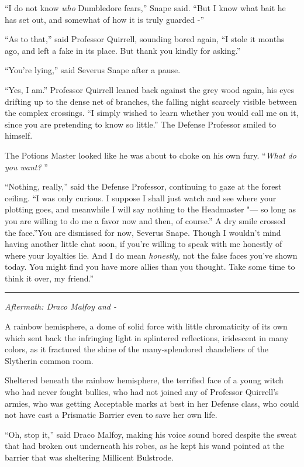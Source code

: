 ``I do not know \emph{who} Dumbledore fears,'' Snape said. ``But I know
what bait he has set out, and somewhat of how it is truly guarded -''

``As to that,'' said Professor Quirrell, sounding bored again, ``I stole
it months ago, and left a fake in its place. But thank you kindly for
asking.''

``You're lying,'' said Severus Snape after a pause.

``Yes, I am.'' Professor Quirrell leaned back against the grey wood
again, his eyes drifting up to the dense net of branches, the falling
night scarcely visible between the complex crossings. ``I simply wished
to learn whether you would call me on it, since you are pretending to
know so little.'' The Defense Professor smiled to himself.

The Potions Master looked like he was about to choke on his own fury.
``\emph{What do you want?} ''

``Nothing, really,'' said the Defense Professor, continuing to gaze at
the forest ceiling. ``I was only curious. I suppose I shall just watch
and see where your plotting goes, and meanwhile I will say nothing to
the Headmaster "--- so long as you are willing to do me a favor now and
then, of course.'' A dry smile crossed the face.''You are dismissed for
now, Severus Snape. Though I wouldn't mind having another little chat
soon, if you're willing to speak with me honestly of where your
loyalties lie. And I do mean \emph{honestly,} not the false faces you've
shown today. You might find you have more allies than you thought. Take
some time to think it over, my friend.''

\begin{center}\rule{3in}{0.4pt}\end{center}

\emph{Aftermath: Draco Malfoy and -}

A rainbow hemisphere, a dome of solid force with little chromaticity of
its own which sent back the infringing light in splintered reflections,
iridescent in many colors, as it fractured the shine of the
many-splendored chandeliers of the Slytherin common room.

Sheltered beneath the rainbow hemisphere, the terrified face of a young
witch who had never fought bullies, who had not joined any of Professor
Quirrell's armies, who was getting Acceptable marks at best in her
Defense class, who could not have cast a Prismatic Barrier even to save
her own life.

``Oh, stop it,'' said Draco Malfoy, making his voice sound bored despite
the sweat that had broken out underneath his robes, as he kept his wand
pointed at the barrier that was sheltering Millicent Bulstrode.

